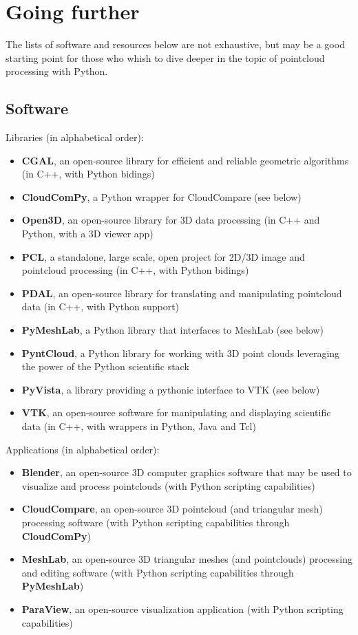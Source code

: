 \section{Going further}

The lists of software and resources below are not exhaustive, but may be a good starting point for those who whish to dive deeper in the topic of pointcloud processing with Python.

\subsection{Software}

Libraries (in alphabetical order):

\begin{itemize}
\item \textbf{CGAL}, an open-source library for efficient and reliable geometric algorithms (in C++, with Python bidings)
\item \textbf{CloudComPy}, a Python wrapper for CloudCompare (see below)
\item \textbf{Open3D}, an open-source library for 3D data processing (in C++ and Python, with a 3D viewer app)
\item \textbf{PCL}, a standalone, large scale, open project for 2D/3D image and pointcloud processing (in C++, with Python bidings)
\item \textbf{PDAL}, an open-source library for translating and manipulating pointcloud data (in C++, with Python support)
\item \textbf{PyMeshLab}, a Python library that interfaces to MeshLab (see below)
\item \textbf{PyntCloud}, a Python library for working with 3D point clouds leveraging the power of the Python scientific stack
\item \textbf{PyVista}, a library providing a pythonic interface to VTK (see below)
\item \textbf{VTK}, an open-source software for manipulating and displaying scientific data (in C++, with wrappers in Python, Java and Tcl)
\end{itemize}

Applications (in alphabetical order):

\begin{itemize}
\item \textbf{Blender}, an open-source  3D computer graphics software that may be used to visualize and process pointclouds (with Python scripting capabilities)
\item \textbf{CloudCompare}, an open-source 3D pointcloud (and triangular mesh) processing software (with Python scripting capabilities through \textbf{CloudComPy})
\item \textbf{MeshLab}, an open-source 3D triangular meshes (and pointclouds) processing and editing software (with Python scripting capabilities through \textbf{PyMeshLab})
\item \textbf{ParaView}, an open-source visualization application (with Python scripting capabilities)
\end{itemize}

